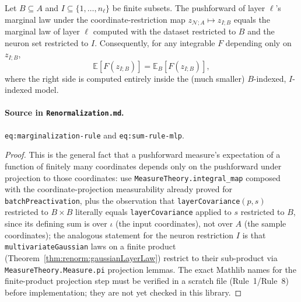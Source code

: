 \begin{theorem}
\label{thm:ngp:marginalizationRule}
Let $B\subseteq A$ and $I\subseteq\{1,\ldots,n_\ell\}$ be finite subsets. The pushforward of layer
$\ell$'s marginal law under the coordinate-restriction map
$z_{\mathcal N;A}\mapsto z_{I;B}$ equals the marginal law of layer $\ell$ computed with the
dataset restricted to $B$ and the neuron set restricted to $I$. Consequently, for any integrable
$F$ depending only on $z_{I;B}$,
\[
  \mathbb E[F(z_{I;B})] = \mathbb E_{B}[F(z_{I;B})],
\]
where the right side is computed entirely inside the (much smaller) $B$-indexed,
$I$-indexed model.

\paragraph{Source in \texttt{Renormalization.md}.}
\texttt{eq:marginalization-rule} and \texttt{eq:sum-rule-mlp}.
\end{theorem}

\begin{proof}
This is the general fact that a pushforward measure's expectation of a function of finitely many
coordinates depends only on the pushforward under projection to those coordinates: use
\texttt{MeasureTheory.integral\_map} composed with the coordinate-projection measurability already
proved for \texttt{batchPreactivation}, plus the observation that
\texttt{layerCovariance}$(p,s)$ restricted to $B\times B$ literally equals
\texttt{layerCovariance} applied to $s$ restricted to $B$, since its defining sum is over $\iota$
(the input coordinates), not over $A$ (the sample coordinates); the analogous statement for the
neuron restriction $I$ is that \texttt{multivariateGaussian} laws on a finite product
(Theorem~\ref{thm:renorm:gaussianLayerLaw}) restrict to their sub-product via
\texttt{MeasureTheory.Measure.pi} projection lemmas. The exact Mathlib names for the
finite-product projection step must be verified in a scratch file (Rule~1/Rule~8) before
implementation; they are not yet checked in this library.
\end{proof}

